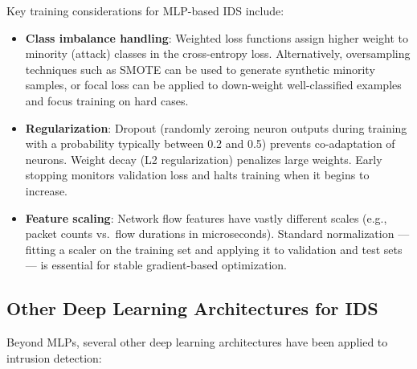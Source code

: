 \par Key training considerations for MLP-based IDS include:

\begin{itemize}
    \item \textbf{Class imbalance handling}: Weighted loss functions assign higher weight to minority (attack) classes in the cross-entropy loss. Alternatively, oversampling techniques such as SMOTE can be used to generate synthetic minority samples, or focal loss can be applied to down-weight well-classified examples and focus training on hard cases.
    \item \textbf{Regularization}: Dropout (randomly zeroing neuron outputs during training with a probability typically between 0.2 and 0.5) prevents co-adaptation of neurons. Weight decay (L2 regularization) penalizes large weights. Early stopping monitors validation loss and halts training when it begins to increase.
    \item \textbf{Feature scaling}: Network flow features have vastly different scales (e.g., packet counts vs.\ flow durations in microseconds). Standard normalization --- fitting a scaler on the training set and applying it to validation and test sets --- is essential for stable gradient-based optimization.
\end{itemize}

\subsection{Other Deep Learning Architectures for IDS}
\label{subsec:other_architectures}

\par Beyond MLPs, several other deep learning architectures have been applied to intrusion detection:


